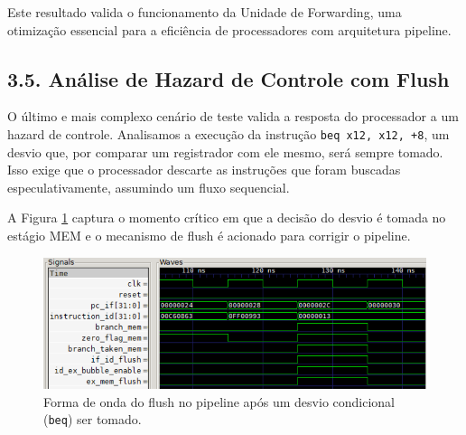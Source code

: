 \documentclass[12pt, a4paper]{article}
\begin{document}
Este resultado valida o funcionamento da Unidade de Forwarding, uma otimização essencial para a eficiência de processadores com arquitetura pipeline.

\subsection*{3.5. Análise de Hazard de Controle com Flush}

O último e mais complexo cenário de teste valida a resposta do processador a um hazard de controle. Analisamos a execução da instrução \texttt{beq x12, x12, +8}, um desvio que, por comparar um registrador com ele mesmo, será sempre tomado. Isso exige que o processador descarte as instruções que foram buscadas especulativamente, assumindo um fluxo sequencial.

A Figura \ref{fig:gtk_flush} captura o momento crítico em que a decisão do desvio é tomada no estágio MEM e o mecanismo de flush é acionado para corrigir o pipeline.

\begin{figure}[H]
    \centering
    \includegraphics[width=1\textwidth]{Cenário 3.png}
    \caption{Forma de onda do flush no pipeline após um desvio condicional (\texttt{beq}) ser tomado.}
    \label{fig:gtk_flush}
\end{figure}
\end{document}
